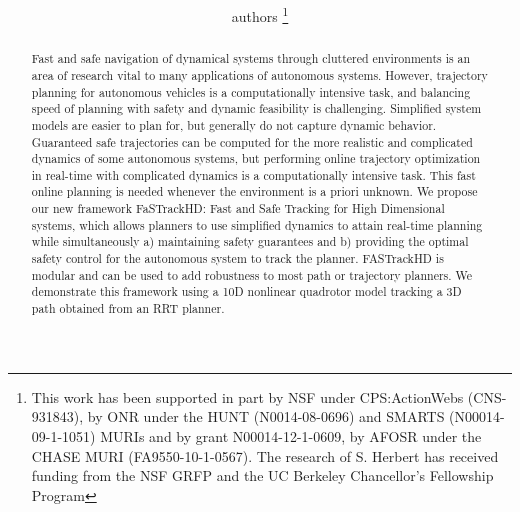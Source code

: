 \documentclass[letterpaper, 10pt, conference]{ieeeconf}      %
\title{\LARGE \bf \MCnote{A Very Good Title}}
\author{authors
\thanks{\color{red}This work has been supported in part by NSF under CPS:ActionWebs (CNS-931843), by ONR under the HUNT (N0014-08-0696) and SMARTS (N00014-09-1-1051) MURIs and by grant N00014-12-1-0609, by AFOSR under the CHASE MURI (FA9550-10-1-0567). The research of S. Herbert has received funding from the NSF GRFP and the UC Berkeley Chancellor's Fellowship Program}
}
\begin{document}
\maketitle
\thispagestyle{empty}
\pagestyle{empty}

\begin{abstract}

Fast and safe navigation of dynamical systems through cluttered environments is an area of research vital to many applications of autonomous systems. However, trajectory planning for autonomous vehicles is a computationally intensive task, and balancing speed of planning with safety and dynamic feasibility is challenging. Simplified system models are easier to plan for, but generally do not capture dynamic behavior. Guaranteed safe trajectories can be computed for the more realistic and complicated dynamics of some autonomous systems, but performing online trajectory optimization in real-time with complicated dynamics is a computationally intensive task. This fast online planning is needed whenever the environment is a priori unknown. We propose our new framework FaSTrackHD: Fast and Safe Tracking for High Dimensional systems, which allows planners to use simplified dynamics to attain real-time planning while simultaneously a) maintaining safety guarantees and b) providing the optimal safety control for the autonomous system to track the planner. FASTrackHD is modular and can be used to add robustness to most path or trajectory planners.
We demonstrate this framework using a 10D nonlinear quadrotor model tracking a 3D path obtained from an RRT planner.
\end{abstract}
\end{document}
